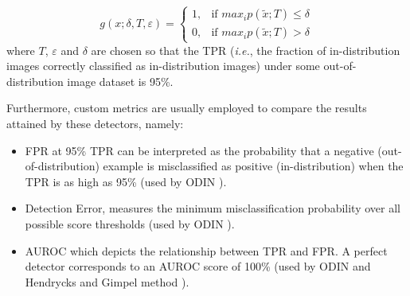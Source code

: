     \begin{equation}
        g(x; \delta, T, \varepsilon) = \begin{cases} 1, & \mbox{if } max_{i}p(\widetilde{x};T) \leq \delta \\ 0, & \mbox{if } max_{i}p(\widetilde{x};T) > \delta \end{cases}
        \label{eqs:odin_threshold}
    \end{equation}
    where $T$, $\varepsilon$ and $\delta$ are chosen so that the \ac{TPR} (\textit{i.e.}, the fraction of in-distribution images correctly classified as in-distribution images) under some out-of-distribution image dataset is 95\%. \par
    
    Furthermore, custom metrics are usually employed to compare the results attained by these detectors, namely:
    \begin{itemize}
        \item FPR at 95\% \ac{TPR} can be interpreted as the probability that a negative (out-of-distribution) example is misclassified as positive (in-distribution) when the \ac{TPR} is as high as 95\% (used by ODIN \cite{odin}). 
        \item Detection Error, measures the minimum misclassification probability over all possible score thresholds (used by ODIN \cite{odin}).
        \item AUROC which depicts the relationship between \ac{TPR} and \ac{FPR}. A perfect detector corresponds to an AUROC score of 100\% (used by ODIN \cite{odin} and Hendrycks and Gimpel method \cite{Hendrycks2019}).
    \end{itemize}